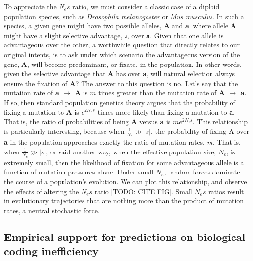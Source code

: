 \documentclass[twocolumn]{article}
\begin{document}
To appreciate the $N_es$ ratio, we must consider a classic case of a diploid population species, such as \textit{Drosophila melanogaster} or \textit{Mus musculus}. In such a species, a given gene might have two possible alleles, \textbf{A} and \textbf{a}, where allele \textbf{A} might have a slight selective advantage, \textit{s}, over \textbf{a}. Given that one allele is advantageous over the other, a worthwhile question that directly relates to our original intents, is to ask under which scenario the advantageous version of the gene, \textbf{A}, will become predominant, or fixate, in the population. In other words, given the selective advantage that \textbf{A} has over \textbf{a}, will natural selection always ensure the fixation of \textbf{A}? The answer to this question is no. Let's say that the mutation rate of \textbf{a $\rightarrow$ A} is $m$ times greater than the mutation rate of \textbf{A $\rightarrow$ a}. If so, then standard population genetics theory\cite{kimura1983neutral, Lynch_2007} argues that the probability of fixing a mutation to \textbf{A} is $e^{2N_es}$ times more likely than fixing a mutation to \textbf{a}. That is, the ratio of probabilities of being \textbf{A} versus \textbf{a} is $me^{2N_es}$. This relationship is particularly interesting, because when $\frac{1}{N_e} \gg |s|$, the probability of fixing \textbf{A} over \textbf{a} in the population approaches exactly the ratio of mutation rates, $m$. That is, when $\frac{1}{N_e} \gg |s|$, or said another way, when the effective population size, $N_e$, is extremely small, then the likelihood of fixation for some advantageous allele is a function of mutation pressures alone. Under small $N_e$, random forces dominate the course of a population's evolution. We can plot this relationship, and observe the effects of altering the $N_es$ ratio [TODO: CITE FIG]. Small $N_es$ ratios result in evolutionary trajectories that are nothing more than the product of mutation rates, a neutral stochastic force. 

\subsection{Empirical support for predictions on biological coding inefficiency} \label{Empirical support for predictions on biological coding inefficiency}
\end{document}
